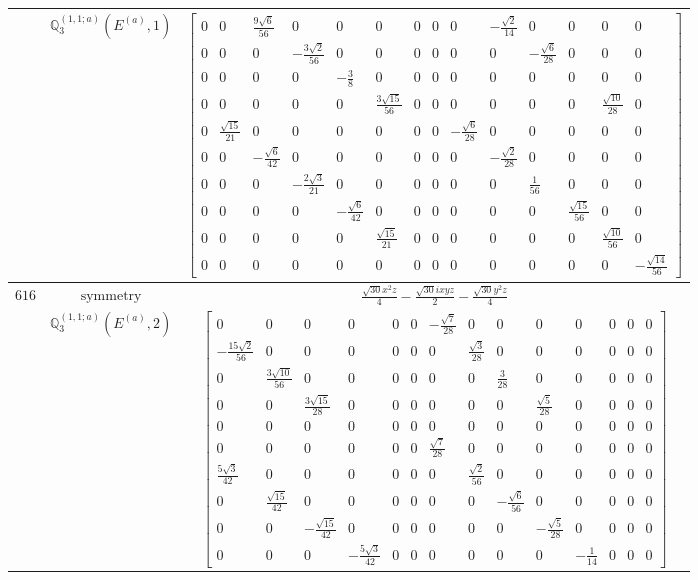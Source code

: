 \documentclass[fleqn,8pt,landscape]{jsarticle}
\begin{document}
\begin{longtable}{ccc}
$  $ & $ \mathbb{Q}_{3}^{(1,1;a)}(E^{(a)},1) $ & $ \begin{bmatrix} 0 & 0 & \frac{9 \sqrt{6}}{56} & 0 & 0 & 0 & 0 & 0 & 0 & - \frac{\sqrt{2}}{14} & 0 & 0 & 0 & 0 \\ 0 & 0 & 0 & - \frac{3 \sqrt{2}}{56} & 0 & 0 & 0 & 0 & 0 & 0 & - \frac{\sqrt{6}}{28} & 0 & 0 & 0 \\ 0 & 0 & 0 & 0 & - \frac{3}{8} & 0 & 0 & 0 & 0 & 0 & 0 & 0 & 0 & 0 \\ 0 & 0 & 0 & 0 & 0 & \frac{3 \sqrt{15}}{56} & 0 & 0 & 0 & 0 & 0 & 0 & \frac{\sqrt{10}}{28} & 0 \\ 0 & \frac{\sqrt{15}}{21} & 0 & 0 & 0 & 0 & 0 & 0 & - \frac{\sqrt{6}}{28} & 0 & 0 & 0 & 0 & 0 \\ 0 & 0 & - \frac{\sqrt{6}}{42} & 0 & 0 & 0 & 0 & 0 & 0 & - \frac{\sqrt{2}}{28} & 0 & 0 & 0 & 0 \\ 0 & 0 & 0 & - \frac{2 \sqrt{3}}{21} & 0 & 0 & 0 & 0 & 0 & 0 & \frac{1}{56} & 0 & 0 & 0 \\ 0 & 0 & 0 & 0 & - \frac{\sqrt{6}}{42} & 0 & 0 & 0 & 0 & 0 & 0 & \frac{\sqrt{15}}{56} & 0 & 0 \\ 0 & 0 & 0 & 0 & 0 & \frac{\sqrt{15}}{21} & 0 & 0 & 0 & 0 & 0 & 0 & \frac{\sqrt{10}}{56} & 0 \\ 0 & 0 & 0 & 0 & 0 & 0 & 0 & 0 & 0 & 0 & 0 & 0 & 0 & - \frac{\sqrt{14}}{56} \end{bmatrix} $ \\ \hline
$ 616 $ & $ \text{symmetry} $ & $ \frac{\sqrt{30} x^{2} z}{4} - \frac{\sqrt{30} i x y z}{2} - \frac{\sqrt{30} y^{2} z}{4} $ \\
$  $ & $ \mathbb{Q}_{3}^{(1,1;a)}(E^{(a)},2) $ & $ \begin{bmatrix} 0 & 0 & 0 & 0 & 0 & 0 & - \frac{\sqrt{7}}{28} & 0 & 0 & 0 & 0 & 0 & 0 & 0 \\ - \frac{15 \sqrt{2}}{56} & 0 & 0 & 0 & 0 & 0 & 0 & \frac{\sqrt{3}}{28} & 0 & 0 & 0 & 0 & 0 & 0 \\ 0 & \frac{3 \sqrt{10}}{56} & 0 & 0 & 0 & 0 & 0 & 0 & \frac{3}{28} & 0 & 0 & 0 & 0 & 0 \\ 0 & 0 & \frac{3 \sqrt{15}}{28} & 0 & 0 & 0 & 0 & 0 & 0 & \frac{\sqrt{5}}{28} & 0 & 0 & 0 & 0 \\ 0 & 0 & 0 & 0 & 0 & 0 & 0 & 0 & 0 & 0 & 0 & 0 & 0 & 0 \\ 0 & 0 & 0 & 0 & 0 & 0 & \frac{\sqrt{7}}{28} & 0 & 0 & 0 & 0 & 0 & 0 & 0 \\ \frac{5 \sqrt{3}}{42} & 0 & 0 & 0 & 0 & 0 & 0 & \frac{\sqrt{2}}{56} & 0 & 0 & 0 & 0 & 0 & 0 \\ 0 & \frac{\sqrt{15}}{42} & 0 & 0 & 0 & 0 & 0 & 0 & - \frac{\sqrt{6}}{56} & 0 & 0 & 0 & 0 & 0 \\ 0 & 0 & - \frac{\sqrt{15}}{42} & 0 & 0 & 0 & 0 & 0 & 0 & - \frac{\sqrt{5}}{28} & 0 & 0 & 0 & 0 \\ 0 & 0 & 0 & - \frac{5 \sqrt{3}}{42} & 0 & 0 & 0 & 0 & 0 & 0 & - \frac{1}{14} & 0 & 0 & 0 \end{bmatrix} $ \\ \hline

\end{longtable}
\end{document}
